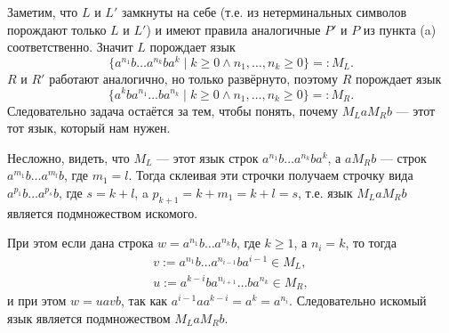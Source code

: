 \documentclass[12pt,a4paper]{article}
\begin{document}
\begin{problem}{3}
\begin{enumerate}
                Заметим, что $L$ и $L'$ замкнуты на себе (т.е. из нетерминальных символов порождают только $L$ и $L'$) и имеют правила аналогичные $P'$ и $P$ из пункта (a) соответственно. Значит $L$ порождает язык
                \[\{a^{n_1} b \dots a^{n_k} b a^k \mid k \geqslant 0 \wedge n_1, \dots, n_k \geqslant 0\} =: M_L.\]
                $R$ и $R'$ работают аналогично, но только развёрнуто, поэтому $R$ порождает язык
                \[\{a^k b a^{n_1} \dots b a^{n_k} \mid k \geqslant 0 \wedge n_1, \dots, n_k \geqslant 0\} =: M_R.\]
                Следовательно задача остаётся за тем, чтобы понять, почему $M_L a M_R b$ --- этот тот язык, который нам нужен.

                Несложно, видеть, что $M_L$ --- этот язык строк $a^{n_1} b \dots a^{n_k} b a^k$, а $a M_R b$ --- строк $a^{m_1} b \dots a^{m_l} b$, где $m_1 = l$. Тогда склеивая эти строчки получаем строчку вида $a^{p_1} b \dots a^{p_s} b$, где $s = k + l$, a $p_{k+1} = k + m_1 = k + l = s$, т.е. язык $M_L a M_R b$ является подмножеством искомого.

                При этом если дана строка $w = a^{n_1} b \dots a^{n_k} b$, где $k \geqslant 1$, а $n_i = k$, то тогда
                \begin{gather*}
                    v := a^{n_1} b \dots a^{n_{i-1}} b a^{i-1} \in M_L,\\
                    u := a^{k-i} b a^{n_{i+1}} \dots b a^{n_k} \in M_R,
                \end{gather*}
                и при этом $w = uavb$, так как $a^{i-1} a a^{k-i} = a^k = a^{n_i}$. Следовательно искомый язык является подмножеством $M_L a M_R b$.
        \end{enumerate}
    \end{problem}
\end{document}
